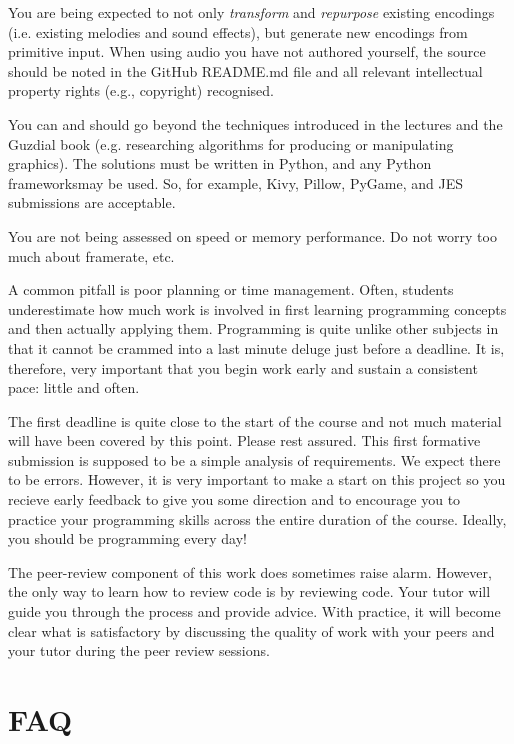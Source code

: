\documentclass{../../fal_assignment}
\begin{document}
You are being expected to not only \textit{transform} and \textit{repurpose} existing encodings (i.e. existing melodies and sound effects), but generate new encodings from primitive input. When using audio you have not authored yourself, the source should be noted in the GitHub README.md file and all relevant intellectual property rights (e.g., copyright) recognised. 

You can and should go beyond the techniques introduced in the lectures and the Guzdial book (e.g. researching algorithms for producing or manipulating graphics). The solutions must be written in Python, and any Python frameworksmay be used. So, for example, Kivy, Pillow, PyGame, and JES submissions are acceptable.

You are not being assessed on speed or memory performance. Do not worry too much about framerate, etc.

A common pitfall is poor planning or time management. Often, students underestimate how much work is involved in first learning programming concepts and then actually applying them. Programming is quite unlike other subjects in that it cannot be crammed into a last minute deluge just before a deadline. It is, therefore, very important that you begin work early and sustain a consistent pace: little and often.

The first deadline is quite close to the start of the course and not much material will have been covered by this point. Please rest assured. This first formative submission is supposed to be a simple analysis of requirements. We expect there to be errors. However, it is very important to make a start on this project so you recieve early feedback to give you some direction and to encourage you to practice your programming skills across the entire duration of the course. Ideally, you should be programming every day!

The peer-review component of this work does sometimes raise alarm. However, the only way to learn how to review code is by reviewing code. Your tutor will guide you through the process and provide advice. With practice, it will become clear what is satisfactory by discussing the quality of work with your peers and your tutor during the peer review sessions. 

\section*{FAQ}
\end{document}
